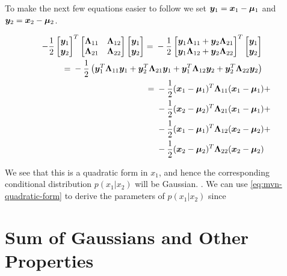 To make the next few equations easier to follow we set ${\bm{y}}_1 = {\bm{x}}_1 - {\bm{\mu}}_1$ and ${\bm{y}}_2 = {\bm{x}}_2 - {\bm{\mu}}_2$.

\begin{align}
\begin{split}
-\frac{1}{2} \begin{bmatrix} \vy_1 \\ \vy_2 \end{bmatrix} ^T \partlambda \begin{bmatrix} \vy_1 \\ \vy_2 \end{bmatrix} ={}& -\frac{1}{2} \begin{bmatrix} \vy_1 \ml{11} + \vy_2 \ml{21} \\ \vy_1 \ml{12} + \vy_2 \ml{22} \end{bmatrix} ^T \begin{bmatrix} \vy_1 \\ \vy_2 \end{bmatrix}
\end{split} \\
%
\begin{split}
={}& -\frac{1}{2} \left( \vy_1^T \ml{11} \vy_1 + \vy_2^T \ml{21} \vy_1 + \vy_1^T \ml{12} \vy_2 + \vy_2^T \ml{22} \vy_2 \right)
\end{split} \\
%
\begin{split}
={}& -\frac{1}{2} (\vx_1 - \vmu_1)^T \ml{11} (\vx_1 - \vmu_1) {}+ \\
  &-\frac{1}{2} (\vx_2 - \vmu_2)^T \ml{21} (\vx_1 - \vmu_1) {}+ \\
  &-\frac{1}{2} (\vx_1 - \vmu_1)^T \ml{12} (\vx_2 - \vmu_2) {}+ \\
  &-\frac{1}{2} (\vx_2 - \vmu_2)^T \ml{22} (\vx_2 - \vmu_2) \label{eq:mvn-quadratic-form}
\end{split}
\end{align}


We see that this is a quadratic form in $x_1$, and hence the corresponding conditional distribution $p(x_1 | x_2)$ will be Gaussian. . We can use \eqref{eq:mvn-quadratic-form} to derive the parameters of $p(x_1 | x_2)$ since


\citep{murphy2012machine}

\section{Sum of Gaussians and Other Properties}

